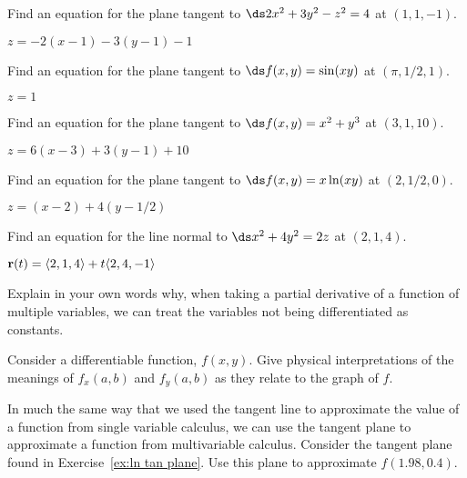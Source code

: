 \begin{enumialphparenastyle}
\begin{ex}
Find an equation for the plane tangent to 
$\ds 2x^2+3y^2-z^2=4$ at
$(1,1,-1)$. 
\begin{sol}
$z=-2(x-1)-3(y-1)-1$
\end{sol}
\end{ex}

\begin{ex}
Find an equation for the plane tangent to 
$\ds f(x,y)=\sin(xy)$ at
$(\pi,1/2,1)$. 
\begin{sol}
$z=1$
\end{sol}
\end{ex}

\begin{ex}
Find an equation for the plane tangent to 
$\ds f(x,y)=x^2+y^3$ at
$(3,1,10)$. 
\begin{sol}
$z=6(x-3)+3(y-1)+10$
\end{sol}
\end{ex}

\begin{ex}\label{ex:ln tan plane}
Find an equation for the plane tangent to 
$\ds f(x,y)=x\ln(xy)$ at
$(2,1/2,0)$. 
\begin{sol}
$z=(x-2)+4(y-1/2)$
\end{sol}
\end{ex}

\begin{ex}
Find an equation for the line normal to 
$\ds x^2+4y^2=2z$ at
$(2,1,4)$. 
\begin{sol}
${\bf r}(t)=\langle 2,1,4\rangle+t\langle 2,4,-1\rangle$
\end{sol}
\end{ex}

\begin{ex}
Explain in your own words why, when taking a partial derivative
of a function of multiple variables, we can treat the variables not
being differentiated as constants.
\end{ex}

\begin{ex}
Consider a differentiable function, $f(x,y)$.  Give physical
  interpretations of the meanings of $f_x(a,b)$ and $f_y(a,b)$ as they
  relate to the graph of $f$.
\end{ex}

\begin{ex}
In much the same way that we used the tangent line to
  approximate the value of a function from single variable calculus,
  we can use the tangent plane to approximate a function from
  multivariable calculus.  Consider the tangent plane found in
  Exercise~\ref{ex:ln tan plane}. Use this plane to approximate
  $f(1.98, 0.4)$.
\end{ex}


\end{enumialphparenastyle}
